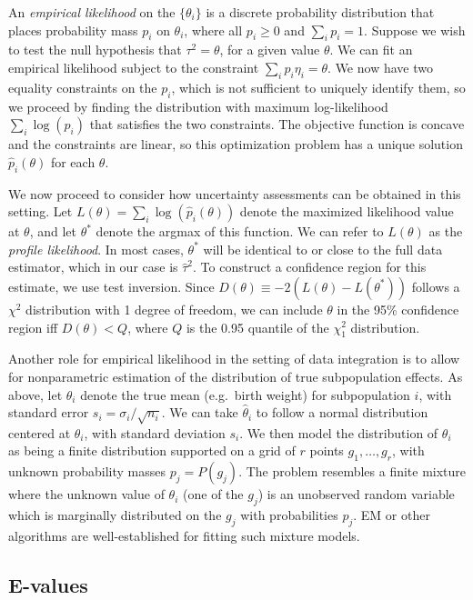 An \textit{empirical likelihood} on the $\{\theta_i\}$ is a discrete probability distribution that places probability mass $p_i$ on $\theta_i$, where all $p_i \ge 0$ and $\sum_i p_i = 1$. Suppose we wish to test the null hypothesis that $\tau^2 = \theta$, for a given value $\theta$. We can fit an empirical likelihood subject to the constraint $\sum_i p_i\eta_i = \theta$. We now have two equality constraints on the $p_i$, which is not sufficient to uniquely identify them, so we proceed by finding the distribution with maximum log-likelihood $\sum_i \log(p_i)$ that satisfies the two constraints. The objective function is concave and the constraints are linear, so this optimization problem has a unique solution $\hat{p}_i(\theta)$ for each $\theta$.

We now proceed to consider how uncertainty assessments can be obtained in this setting. Let $L(\theta) = \sum_i \log(\hat{p}_i(\theta))$ denote the maximized likelihood value at $\theta$, and let $\theta^*$ denote the argmax of this function. We can refer to $L(\theta)$ as the \textit{profile likelihood}. In most cases, $\theta^*$ will be identical to or close to the full data estimator, which in our case is $\hat{\tau}^2$. To construct a confidence region for this estimate, we use test inversion. Since $D(\theta) \equiv -2(L(\theta) - L(\theta^*))$ follows a $\chi^2$ distribution with 1 degree of freedom, we can include $\theta$ in the 95\% confidence region iff $D(\theta) < Q$, where $Q$ is the 0.95 quantile of the $\chi^2_1$ distribution.

Another role for empirical likelihood in the setting of data integration is to allow for nonparametric estimation of the distribution of true subpopulation effects.  As above, let $\theta_i$ denote the true mean (e.g.\ birth weight) for subpopulation $i$, with standard error $s_i = \sigma_i / \sqrt{n_i}$.  We can take $\hat{\theta}_i$ to follow a normal distribution centered at $\theta_i$, with standard deviation $s_i$.  We then model the distribution of $\theta_i$ as being a finite distribution supported on a grid of $r$ points $g_1, \ldots, g_r$, with unknown probability masses $p_j = P(g_j)$.  The problem resembles a finite mixture where the unknown value of $\theta_i$ (one of the $g_j$) is an unobserved random variable which is marginally distributed on the $g_j$ with probabilities $p_j$.  EM or other algorithms are well-established for fitting such mixture models.

\subsection{E-values}

